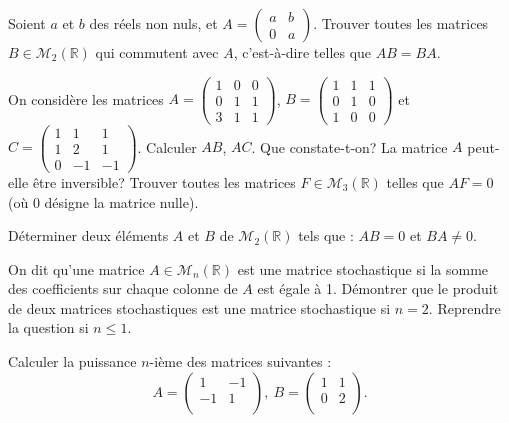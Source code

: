 \documentclass{book}
\begin{document}
\begin{Exercice}[Commutant]
Soient $a$ et $b$ des réels non nuls, et $A=\left( \begin{array}{cc} a & b\\ 
 0 &a \end{array} \right).$ Trouver toutes les matrices $B\in\mathcal M_2(\mathbb R)$ qui commutent avec $A$,
c'est-à-dire telles que $AB=BA$.

\end{Exercice}

\begin{Exercice}[Annulateur]

On considère les matrices $A=\left(\begin{array}{ccc}
1&0&0\\
0&1&1\\
3&1&1\end{array}\right)$, $B=\left(\begin{array}{ccc}
1&1&1\\
0&1&0\\
1&0&0\end{array}\right)$ et $C=\left(\begin{array}{ccc}
1&1&1\\
1&2&1\\
0&-1&-1\end{array}\right)$. Calculer $AB$, $AC$. Que constate-t-on? La matrice $A$ peut-elle être inversible? 
Trouver toutes les matrices $F\in\mathcal M_3(\mathbb R)$ telles que $AF=0$ (où $0$ désigne la matrice nulle).
\end{Exercice}

\begin{Exercice}

Déterminer deux éléments $A$ et $B$ de
$\mathcal M_2({\mathbb R})$ tels que : $AB=0$ et $BA\not = 0$.
\end{Exercice}


\begin{Exercice}
On dit qu'une matrice $A\in\mathcal M_n(\mathbb R)$ est une matrice stochastique si la somme des coefficients
sur chaque colonne de $A$ est égale à 1. Démontrer que le produit de deux matrices stochastiques est
une matrice stochastique si $n=2$. Reprendre la question si $n\leq 1$.
\end{Exercice}

\begin{Exercice}

Calculer la puissance $n$-ième des matrices suivantes : 
$$A=\left(\begin{array}{cc}
1&-1\\
-1&1\\
\end{array}\right),\ B=\left(\begin{array}{cc}
1&1\\
0&2\\
\end{array}\right).$$
\end{Exercice}
\end{document}
